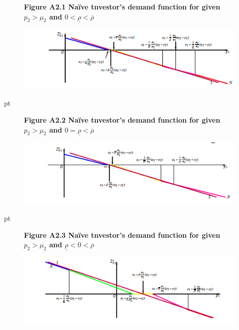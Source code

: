 \documentclass[10.0pt]{article}
\begin{document}
\newpage 
\begin{figure}
\centerline{\bf Figure A2.1 \quad Na\"ive tnvestor's demand function for given $ p_2 > \mu_2 $ and $ 0 < \underline{\rho} < \overline{\rho} $}
	\centering
	\includegraphics[width=1.0 \textwidth]{FigureA2.1.png}
\end{figure}

 pt


\begin{figure}
\centerline{\bf Figure A2.2 \quad Na\"ive tnvestor's demand function for given $ p_2 > \mu_2 $ and $ 0 = \underline{\rho} < \overline{\rho} $}
	\centering
	\includegraphics[width=1.0 \textwidth]{FigureA2.2.png}
\end{figure}

 pt



\begin{figure}
\centerline{\bf Figure A2.3 \quad Na\"ive tnvestor's demand function for given $ p_2 > \mu_2 $ and $ \underline{\rho} < 0 < \overline{\rho} $}
	\centering
	\includegraphics[width=1.0 \textwidth]{FigureA2.3.png}
\end{figure}


\end{document}
